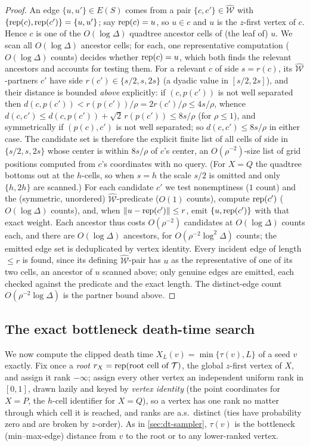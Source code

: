 \begin{proof}
An edge $\{u,u'\}\in E(S)$ comes from a pair $\{c,c'\}\in\widehat{\mathcal W}$ with $\{\operatorname{rep}(c),\operatorname{rep}(c')\}=
\{u,u'\}$; say $\operatorname{rep}(c)=u$, so $u\in c$ and $u$ is the $z$-first vertex of $c$. Hence $c$ is one of the
$O(\log\Delta)$ quadtree ancestor cells of (the leaf of) $u$. We scan all $O(\log\Delta)$ ancestor cells;
for each, one representative computation ($O(\log\Delta)$ counts) decides whether $\operatorname{rep}(c)=u$, which both
finds the relevant ancestors and accounts for testing them. For a relevant $c$ of side $s=r(c)$, its
$\widehat{\mathcal W}$-partners $c'$ have side $r(c')\in\{s/2,s,2s\}$ (a dyadic value in $[s/2,2s]$), and
their distance is bounded \emph{above} explicitly: if $(c,p(c'))$ is not well separated then $d(c,p(c'))<
r(p(c'))/\rho=2r(c')/\rho\le 4s/\rho$, whence $d(c,c')\le d(c,p(c'))+\sqrt2\,r(p(c'))\le 8s/\rho$ (for
$\rho\le1$), and symmetrically if $(p(c),c')$ is not well separated; so $d(c,c')\le 8s/\rho$ in either
case. The candidate set is therefore the explicit finite list of all cells of side in $\{s/2,s,2s\}$ whose
center is within $8s/\rho$ of $c$'s center, an $O(\rho^{-2})$-size list of grid positions computed from
$c$'s coordinates with no query. (For $X=Q$ the quadtree bottoms out at the $h$-cells, so when $s=h$ the
scale $s/2$ is omitted and only $\{h,2h\}$ are scanned.) For each candidate $c'$ we test nonemptiness ($1$ count) and the (symmetric,
unordered) $\widehat{\mathcal W}$-predicate ($O(1)$ counts), compute $\operatorname{rep}(c')$ ($O(\log\Delta)$ counts),
and, when $\left\lVert u-\operatorname{rep}(c') \right\rVert\le r$, emit $\{u,\operatorname{rep}(c')\}$ with that exact weight. Each ancestor thus costs
$O(\rho^{-2})$ candidates at $O(\log\Delta)$ counts each, and there are $O(\log\Delta)$ ancestors, for
$O(\rho^{-2}\log^2\Delta)$ counts; the emitted edge set is deduplicated by vertex identity. Every incident
edge of length $\le r$ is found, since its defining $\widehat{\mathcal W}$-pair has $u$ as the
representative of one of its two cells, an ancestor of $u$ scanned above; only genuine edges are emitted,
each checked against the predicate and the exact length. The distinct-edge count $O(\rho^{-2}\log\Delta)$ is
the partner bound above.
\end{proof}

\subsection{The exact bottleneck death-time search}\label{sec:wspd-search}

We now compute the clipped death time $X_L(v)=\min\{\tau(v),L\}$ of a seed $v$ exactly. Fix once a
\emph{root} $r_X=\operatorname{rep}(\text{root cell of }\mathcal T)$, the global $z$-first vertex of $X$, and assign it
rank $-\infty$; assign every other vertex an independent uniform rank in $[0,1]$, drawn lazily and keyed
by \emph{vertex identity} (the point coordinates for $X=P$, the $h$-cell identifier for $X=Q$), so a
vertex has one rank no matter through which cell it is reached, and ranks are a.s.\ distinct (ties have
probability zero and are broken by $z$-order). As in \cref{sec:dt-sampler}, $\tau(v)$ is the bottleneck
(min--max-edge) distance from $v$ to the root or to any lower-ranked vertex.

